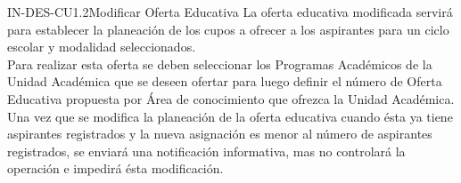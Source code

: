 \begin{UseCase}{IN-DES-CU1.2}{Modificar Oferta Educativa}{
	La oferta educativa modificada servirá para establecer la planeación de los cupos a ofrecer a los aspirantes para un ciclo escolar y modalidad seleccionados.\\

	Para realizar esta oferta se deben seleccionar los Programas Académicos de la Unidad Académica que se deseen ofertar para luego definir el número de Oferta Educativa propuesta por Área de conocimiento que ofrezca la Unidad Académica.\\
	
	Una vez que se modifica la planeación de la oferta educativa cuando ésta ya tiene aspirantes registrados y la nueva asignación es menor al número de aspirantes registrados, se enviará una notificación informativa, mas no controlará la operación e impedirá ésta modificación.	
}
	

	
	
	
\end{UseCase}
